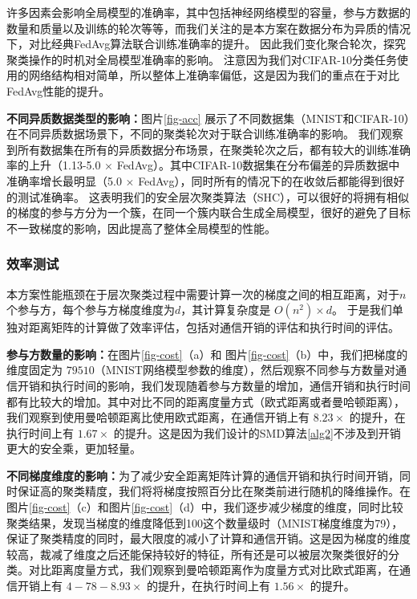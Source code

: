 许多因素会影响全局模型的准确率，其中包括神经网络模型的容量，参与方数据的数量和质量以及训练的轮次等等，而我们关注的是本方案在数据分布为异质的情况下，对比经典FedAvg算法联合训练准确率的提升。
因此我们变化聚合轮次，探究聚类操作的时机对全局模型准确率的影响。
注意因为我们对CIFAR-10分类任务使用的网络结构相对简单，所以整体上准确率偏低，这是因为我们的重点在于对比FedAvg性能的提升。

\textbf{不同异质数据类型的影响：}图片\ref{fig-acc} 展示了不同数据集（MNIST和CIFAR-10）在不同异质数据场景下，不同的聚类轮次对于联合训练准确率的影响。
我们观察到所有数据集在所有的异质数据分布场景，在聚类轮次之后，都有较大的训练准确率的上升（1.13-5.0 $\times$ FedAvg）。其中CIFAR-10数据集在分布偏差的异质数据中准确率增长最明显（5.0 $\times$ FedAvg），同时所有的情况下的在收敛后都能得到很好的测试准确率。
这表明我们的安全层次聚类算法（SHC），可以很好的将拥有相似的梯度的参与方分为一个簇，在同一个簇内联合生成全局模型，很好的避免了目标不一致梯度的影响，因此提高了整体全局模型的性能。

\subsubsection{效率测试}
本方案性能瓶颈在于层次聚类过程中需要计算一次的梯度之间的相互距离，对于$n$个参与方，每个参与方梯度维度为$d$，其计算复杂度是 $O(n^2)\times d$。
于是我们单独对距离矩阵的计算做了效率评估，包括对通信开销的评估和执行时间的评估。

\textbf{参与方数量的影响：}在图片\ref{fig-cost}（a）和 图片\ref{fig-cost}（b）中，我们把梯度的维度固定为 $79510$（MNIST网络模型参数的维度），然后观察不同参与方数量对通信开销和执行时间的影响，我们发现随着参与方数量的增加，通信开销和执行时间都有比较大的增加。其中对比不同的距离度量方式（欧式距离或者曼哈顿距离），我们观察到使用曼哈顿距离比使用欧式距离，在通信开销上有 $8.23 \times$ 的提升，在执行时间上有 $1.67 \times$ 的提升。这是因为我们设计的SMD算法\ref{alg2}不涉及到开销更大的安全乘，更加轻量。

\textbf{不同梯度维度的影响：}为了减少安全距离矩阵计算的通信开销和执行时间开销，同时保证高的聚类精度，我们将将梯度按照百分比在聚类前进行随机的降维操作。在图片\ref{fig-cost}（c）和图片\ref{fig-cost}（d）中，我们逐步减少梯度的维度，同时比较聚类结果，发现当梯度的维度降低到100这个数量级时（MNIST梯度维度为79），保证了聚类精度的同时，最大限度的减小了计算和通信开销。这是因为梯度的维度较高，裁减了维度之后还能保持较好的特征，所有还是可以被层次聚类很好的分类。对比距离度量方式，我们观察到曼哈顿距离作为度量方式对比欧式距离，在通信开销上有 $4-78-8.93 \times$ 的提升，在执行时间上有 $1.56 \times$ 的提升。


